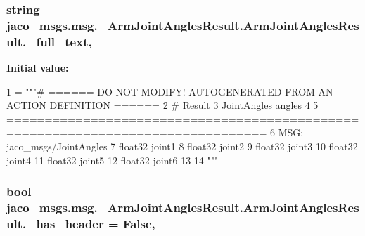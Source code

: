 \subsubsection[{\texorpdfstring{\+\_\+full\+\_\+text}{_full_text}}]{\setlength{\rightskip}{0pt plus 5cm}string jaco\+\_\+msgs.\+msg.\+\_\+\+Arm\+Joint\+Angles\+Result.\+Arm\+Joint\+Angles\+Result.\+\_\+full\+\_\+text\hspace{0.3cm}{\ttfamily [static]}, {\ttfamily [private]}}\hypertarget{classjaco__msgs_1_1msg_1_1__ArmJointAnglesResult_1_1ArmJointAnglesResult_adc203abfb68dbcff984e0ae0425189a5}{}\label{classjaco__msgs_1_1msg_1_1__ArmJointAnglesResult_1_1ArmJointAnglesResult_adc203abfb68dbcff984e0ae0425189a5}
{\bfseries Initial value\+:}
\begin{DoxyCode}
1 = \textcolor{stringliteral}{"""# ====== DO NOT MODIFY! AUTOGENERATED FROM AN ACTION DEFINITION ======}
2 \textcolor{stringliteral}{# Result}
3 \textcolor{stringliteral}{JointAngles angles}
4 \textcolor{stringliteral}{}
5 \textcolor{stringliteral}{================================================================================}
6 \textcolor{stringliteral}{MSG: jaco\_msgs/JointAngles}
7 \textcolor{stringliteral}{float32 joint1}
8 \textcolor{stringliteral}{float32 joint2}
9 \textcolor{stringliteral}{float32 joint3}
10 \textcolor{stringliteral}{float32 joint4}
11 \textcolor{stringliteral}{float32 joint5}
12 \textcolor{stringliteral}{float32 joint6}
13 \textcolor{stringliteral}{}
14 \textcolor{stringliteral}{"""}
\end{DoxyCode}
\subsubsection[{\texorpdfstring{\+\_\+has\+\_\+header}{_has_header}}]{\setlength{\rightskip}{0pt plus 5cm}bool jaco\+\_\+msgs.\+msg.\+\_\+\+Arm\+Joint\+Angles\+Result.\+Arm\+Joint\+Angles\+Result.\+\_\+has\+\_\+header = False\hspace{0.3cm}{\ttfamily [static]}, {\ttfamily [private]}}\hypertarget{classjaco__msgs_1_1msg_1_1__ArmJointAnglesResult_1_1ArmJointAnglesResult_a9917ddd6144c938a121558c001e1f588}{}\label{classjaco__msgs_1_1msg_1_1__ArmJointAnglesResult_1_1ArmJointAnglesResult_a9917ddd6144c938a121558c001e1f588}
